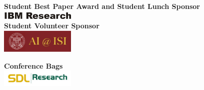 \vspace{10mm}
{\bf \large Student Best Paper Award and Student Lunch Sponsor}\vspace{5mm} \\
\hspace*{5mm}\includegraphics[width=1.4in]{content/fmatter/sponsors/IBM_Research.pdf} \\

\vspace{10mm}
{\bf \large Student Volunteer Sponsor}\vspace{5mm} \\
\hspace*{5mm}\includegraphics[width=1.4in]{content/fmatter/sponsors/usc-logo.pdf}

\vspace{10mm}
{\bf \large Conference Bags}\vspace*{5mm} \\
\hspace*{5mm}\includegraphics[width=1.4in]{content/fmatter/sponsors/sdl-logo.pdf}

\vfill
